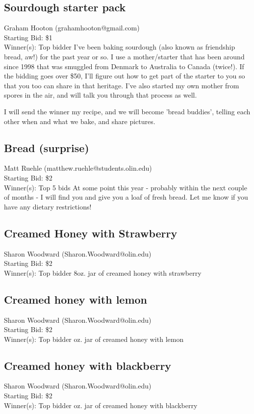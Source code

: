 \documentclass[11pt]{article}
\begin{document}
\subsection{Sourdough starter pack}
Graham Hooton (grahamhooton@gmail.com) \\
Starting Bid: \$1 \\
Winner(s): 
Top bidder\newline
I've been baking sourdough (also known as friendship bread, aw!) for the past year or so. I use a mother/starter that has been around since 1998 that was smuggled from Denmark to Australia to Canada (twice!). If the bidding goes over \$50, I'll figure out how to get part of the starter to you so that you too can share in that heritage. I've also started my own mother from spores in the air, and will talk you through that process as well.

I will send the winner my recipe, and we will become 'bread buddies', telling each other when and what we bake, and share pictures.
\subsection{Bread (surprise)}
Matt Ruehle (matthew.ruehle@students.olin.edu) \\
Starting Bid: \$2 \\
Winner(s): 
Top 5 bids\newline
At some point this year - probably within the next couple of months - I will find you and give you a loaf of fresh bread. Let me know if you have any dietary restrictions!
\subsection{Creamed Honey with Strawberry}
Sharon Woodward (Sharon.Woodward@olin.edu) \\
Starting Bid: \$2 \\
Winner(s): 
Top bidder\newline
 8oz. jar of creamed honey with strawberry
\subsection{Creamed honey with lemon}
Sharon Woodward (Sharon.Woodward@olin.edu) \\
Starting Bid: \$2 \\
Winner(s): 
Top bidder oz. jar of creamed honey with lemon
\subsection{Creamed honey with blackberry}
Sharon Woodward (Sharon.Woodward@olin.edu) \\
Starting Bid: \$2 \\
Winner(s): 
Top bidder oz. jar of creamed honey with blackberry
\end{document}
